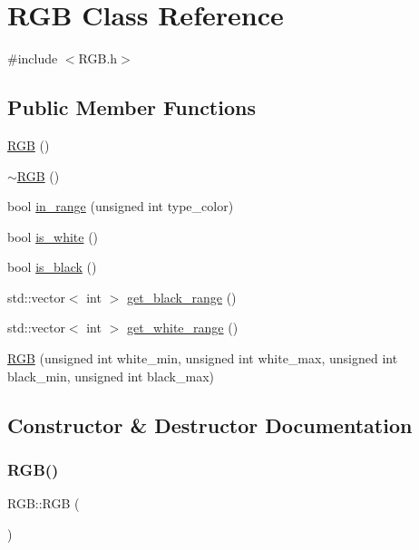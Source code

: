 \hypertarget{class_r_g_b}{}\section{R\+GB Class Reference}
\label{class_r_g_b}


{\ttfamily \#include $<$R\+G\+B.\+h$>$}

\subsection*{Public Member Functions}
\begin{DoxyCompactItemize}
\item 
\mbox{\hyperlink{class_r_g_b_ac82f37558b845c294de41eb2558c6619}{R\+GB}} ()
\item 
\mbox{\hyperlink{class_r_g_b_aba3fa8736bbef986a77b56613ddc6275}{$\sim$\+R\+GB}} ()
\item 
bool \mbox{\hyperlink{class_r_g_b_a61239b0df41eba4c53a2a7c6feaff698}{in\+\_\+range}} (unsigned int type\+\_\+color)
\item 
bool \mbox{\hyperlink{class_r_g_b_aa8289d37cc58a81e02b857fb91bfca5c}{is\+\_\+white}} ()
\item 
bool \mbox{\hyperlink{class_r_g_b_a6d5013f3b077886a1a92fa2b16628d22}{is\+\_\+black}} ()
\item 
std\+::vector$<$ int $>$ \mbox{\hyperlink{class_r_g_b_aa745e7dff1d7b49c78fa12da0c6e0835}{get\+\_\+black\+\_\+range}} ()
\item 
std\+::vector$<$ int $>$ \mbox{\hyperlink{class_r_g_b_a96764f94cfd38f38b0e975c3c77ffaa5}{get\+\_\+white\+\_\+range}} ()
\item 
\mbox{\hyperlink{class_r_g_b_acd5aafc2415ca6b82089d887e91e2035}{R\+GB}} (unsigned int white\+\_\+min, unsigned int white\+\_\+max, unsigned int black\+\_\+min, unsigned int black\+\_\+max)
\end{DoxyCompactItemize}


\subsection{Constructor \& Destructor Documentation}
\mbox{\label{class_r_g_b_ac82f37558b845c294de41eb2558c6619}} 
\subsubsection{\texorpdfstring{R\+G\+B()}{RGB()}\hspace{0.1cm}{\footnotesize\ttfamily [1/2]}}
{\footnotesize\ttfamily R\+G\+B\+::\+R\+GB (\begin{DoxyParamCaption}{ }\end{DoxyParamCaption})}

